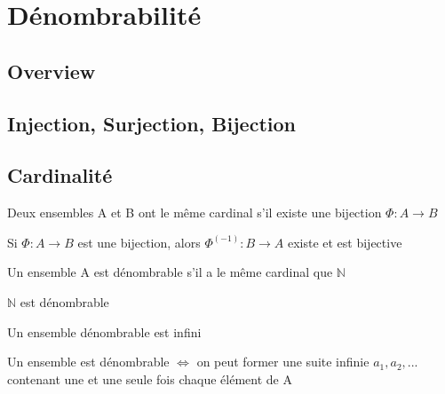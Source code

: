 \documentclass{article}
\begin{document}
\section{Dénombrabilité}
\subsection{Overview}

\subsection{Injection, Surjection, Bijection}

\begin{definition}[Injection]
\end{definition}

\begin{definition}[Surjection]
\end{definition}

\begin{theorem}[Bijection]
\end{theorem}

\subsection{Cardinalité}

\begin{definition}[Cardinalité]
    Deux ensembles A et B ont le même cardinal s'il existe une bijection $\Phi:A \to B$
\end{definition}

\begin{corollary}
    Si $\Phi:A \to B$ est une bijection, alors $\Phi ^(-1): B \to A$ existe et est
    bijective
\end{corollary}

\begin{definition}[Dénombrabilité]
    Un ensemble A est dénombrable s'il a le même cardinal que $\mathbb{N}$
\end{definition}

\begin{remark}
\item $\mathbb{N}$ est dénombrable
\item Un ensemble dénombrable est infini
\item Un ensemble est dénombrable $\Longleftrightarrow$ on peut former une suite
    infinie $a_1, a_2, ...$ contenant une et une seule fois chaque élément de A
\end{remark}
\end{document}

